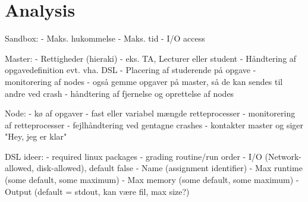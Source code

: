 \section*{Analysis}

Sandbox:
- Maks. hukommelse
- Maks. tid
- I/O access

Master:
- Rettigheder (hieraki) - eks. TA, Lecturer eller student
- Håndtering af opgavedefinition evt. vha. DSL
- Placering af studerende på opgave
- monitorering af nodes
- også gemme opgaver på master, så de kan sendes til andre ved crash
- håndtering af fjernelse og oprettelse af nodes

Node:
- kø af opgaver
- fast eller variabel mængde retteprocesser
- monitorering af retteprocesser
- fejlhåndtering ved gentagne crashes
- kontakter master og siger "Hey, jeg er klar"


DSL ideer:
- required linux packages
- grading routine/run order
- I/O (Network-allowed, disk-allowed), default false
- Name (assignment identifier)
- Max runtime (some default, some maximum)
- Max memory (some default, some maximum)
- Output (default = stdout, kan være fil, max size?)
